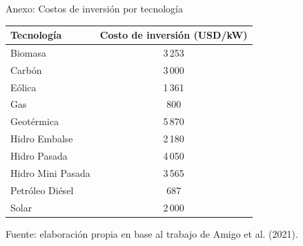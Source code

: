 \documentclass[xcolor=dvipsnames]{beamer}
\begin{document}
\begin{frame}{Anexo: Costos de inversión por tecnología}

\centering

\renewcommand{\arraystretch}{1.15}
\setlength{\tabcolsep}{12pt}

\begin{table}
\centering
\small
\begin{tabular}{l c}
\toprule
\textbf{Tecnología} & \textbf{Costo de inversión (USD/kW)} \\
\midrule
Biomasa            & 3\,253 \\
Carbón             & 3\,000 \\
Eólica             & 1\,361 \\
Gas                & 800 \\
Geotérmica         & 5\,870 \\
Hidro Embalse      & 2\,180 \\
Hidro Pasada       & 4\,050 \\
Hidro Mini Pasada  & 3\,565 \\
Petróleo Diésel    & 687 \\
Solar              & 2\,000 \\
\bottomrule
\end{tabular}
\end{table}

\vspace{0.15cm}

{\footnotesize Fuente: elaboración propia en base al trabajo de Amigo et al. (2021).}

\end{frame}
\end{document}
